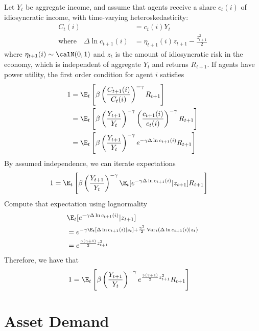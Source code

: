 \documentclass[12pt]{article}
\theoremstyle{plain}
\theoremstyle{definition}
\theoremstyle{remark}
\newcommand{\Var}{\operatorname{Var}}
\begin{document}
\begin{multicols*}{2}
Let $Y_t$ be aggregate income, and assume that agents receive
a share $c_t(i)$ of idiosyncratic income, with time-varying
heteroskedasticity:
\begin{align*}
  C_t(i) &= c_t(i) Y_t \\
  \text{where}\quad
  \Delta \ln c_{t+1}(i)
  &= \eta_{t+1}(i) z_{t+1} - \frac{z^2_{t+1}}{2}
\end{align*}
where $\eta_{t+1}(i)\sim \calN(0,1)$ and $z_t$ is the amount of
idiosyncratic risk in the economy, which is independent of aggregate
$Y_t$ and returns $R_{t+1}$.
If agents have power utility, the first order condition
for agent $i$ satisfies
\begin{align*}
  1
  &=
  \E_t\left[
    \beta \left(
    \frac{C_{t+1}(i)}{C_t(i)}
    \right)^{-\gamma}
    R_{t+1}
  \right]
  \\
  &=
  \E_t\left[
    \beta
    \left(
    \frac{Y_{t+1}}{Y_t}
    \right)^{-\gamma}
    \left(
    \frac{c_{t+1}(i)}{c_t(i)}
    \right)^{-\gamma}
    R_{t+1}
  \right]
  \\
  &=
  \E_t\left[
    \beta
    \left(
    \frac{Y_{t+1}}{Y_t}
    \right)^{-\gamma}
    e^{-\gamma \Delta \ln c_{t+1}(i)}
    R_{t+1}
  \right]
\end{align*}
By assumed independence, we can iterate expectations
\begin{align*}
  1
  &=
  \E_t\left[
    \beta
    \left(
    \frac{Y_{t+1}}{Y_t}
    \right)^{-\gamma}
    \E_t[
    e^{-\gamma \Delta \ln c_{t+1}(i)}|z_{t+1}
    ]
    R_{t+1}
  \right]
\end{align*}
Compute that expectation using lognormality
\begin{align*}
  &\E_t[
  e^{-\gamma \Delta \ln c_{t+1}(i)}|z_{t+1}
  ]
  \\
  &=
  e^{%
    -\gamma
    \E_t[\Delta\ln c_{t+1}(i)|z_t]
    + \frac{\gamma^2}{2}\Var_t(\Delta \ln c_{t+1}(i)|z_t)
  }
  \\
  &=
  e^{%
    \frac{\gamma(\gamma+1)}{2}
    z_{t+1}^2
  }
\end{align*}
Therefore, we have that
\begin{align*}
  1
  &=
  \E_t\left[
    \beta
    \left(
    \frac{Y_{t+1}}{Y_t}
    \right)^{-\gamma}
    e^{%
      \frac{\gamma(\gamma+1)}{2}
      z_{t+1}^2
    }
    R_{t+1}
  \right]
\end{align*}



\clearpage
\section{Asset Demand}



\end{multicols*}
\end{document}
